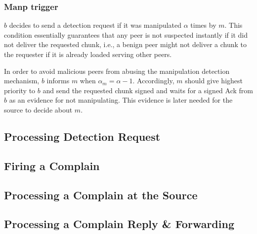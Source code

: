 \subsubsection*{Manp trigger}
$b$ decides to send a detection request if it was manipulated $\alpha$ times by $m$.
This condition essentially guarantees that any peer is not suspected instantly if it did not deliver the requested chunk, i.e., a benign peer might not deliver a chunk to the requester if it is already loaded serving other peers.

In order to avoid malicious peers from abusing the manipulation detection mechanism, $b$ informs $m$ when $\alpha_m = \alpha -1$.
Accordingly, $m$ should give highest priority to $b$ and send the requested chunk signed and waits for a signed Ack from $b$ as an evidence for not manipulating.
This evidence is later needed for the source to decide about $m$.

\subsection{Processing Detection Request}

\subsection{Firing a Complain}
\label{sec:Firing_a_Complain}

\subsection{Processing a Complain at the Source}

\subsection{Processing a Complain Reply \& Forwarding}







